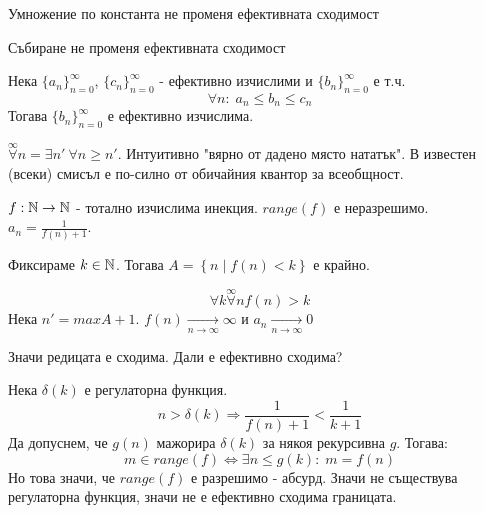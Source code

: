 \begin{example}
    Умножение по константа не променя ефективната сходимост
\end{example}
\begin{example}
    Събиране не променя ефективната сходимост
\end{example}
\begin{lemma}
    Нека $\{a_n\}_{n=0}^\infty$, $\{c_n\}_{n=0}^\infty$ - ефективно изчислими и $\{b_n\}_{n=0}^\infty$ е т.ч.
    \begin{equation*}
        \forall n:\; a_n \leq b_n \leq c_n
    \end{equation*}
    Тогава $\{b_n\}_{n=0}^\infty$ е ефективно изчислима.
\end{lemma}
\begin{notation}
    $\overset{\infty}{\forall}n = \exists n'\ \forall n \geq n'$. Интуитивно "вярно от дадено място нататък". В известен (всеки) смисъл е по-силно от обичайния квантор за всеобщност.
\end{notation}
\begin{example}
    $f: {\mathbb{N}} \to {\mathbb{N}}$ - тотално изчислима инекция. $range(f)$ е неразрешимо. $a_n = \frac{1}{f(n) + 1}$.

    Фиксираме $k \in {\mathbb{N}}$. Тогава $A = \left\{n \mid f(n) < k\right\}$ е крайно.

    \begin{equation*}
        \forall k \overset{\infty}{\forall}n f(n) > k
    \end{equation*}
    Нека $n' = max A + 1$. $f(n) \underset{n \to \infty}{\longrightarrow} \infty$ и $a_n \underset{n \to \infty}{\longrightarrow} 0$

    Значи редицата е сходима. Дали е ефективно сходима?

    Нека $\delta(k)$ е регулаторна функция. 
    \begin{equation*}
        n > \delta(k) \Rightarrow \frac{1}{f(n) + 1} < \frac{1}{k+1}
    \end{equation*}
    Да допуснем, че $g(n)$ мажорира $\delta(k)$ за някоя рекурсивна $g$. Тогава:
    \begin{equation*}
        m \in range(f) \iff \exists n \leq g(k):\; m = f(n)
    \end{equation*}
    Но това значи, че $range(f)$ е разрешимо - абсурд. Значи не съществува регулаторна функция, значи не е ефективно сходима границата.
\end{example}